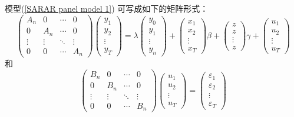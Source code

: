\documentclass[cs4size]{article}
\begin{document}
模型(\ref{SARAR panel model 1}) 可写成如下的矩阵形式：
\[
\left(
\begin{array}{cccc}
 A_n& 0&\cdots & 0\\ 
 0& A_n &\cdots& 0\\ 
 \vdots& \vdots& \ddots&\vdots \\ 
 0& 0&\cdots &A_n
\end{array}
\right )
\left(
\begin{array}{c}
 y_{1}\\ 
 y_{2}\\ 
 \vdots \\ 
 y_{T}
\end{array}
\right)
=\lambda
\left(
\begin{array}{c}
 y_{0}\\ 
 y_{1}\\ 
 \vdots \\ 
 y_{n}
\end{array}
\right )
+
\left(
\begin{array}{c}
 x_{1}\\ 
 x_{2}\\ 
 \vdots \\ 
 x_{T}
\end{array} 
\right ) \beta
+
\left(
\begin{array}{c}
 z\\ 
 z\\ 
 \vdots \\ 
 z
\end{array}
\right ) \gamma
+
\left(
\begin{array}{c}
 u_1\\ 
 u_2\\ 
 \vdots \\ 
 u_T
\end{array}
\right )
\]
和
\[
\left(
\begin{array}{cccc}
 B_n& 0&\cdots & 0\\ 
 0& B_n &\cdots& 0\\ 
 \vdots& \vdots& \ddots&\vdots \\ 
 0& 0&\cdots &B_n
\end{array}
\right )
\left(
\begin{array}{c}
 u_{1}\\ 
 u_{2}\\ 
 \vdots \\ 
 u_{T}
\end{array}
\right )
=
\left(
\begin{array}{c}
 \varepsilon_{1}\\ 
 \varepsilon_{2}\\ 
 \vdots \\ 
 \varepsilon_{T}
\end{array}
\right )
\]
\end{document}
